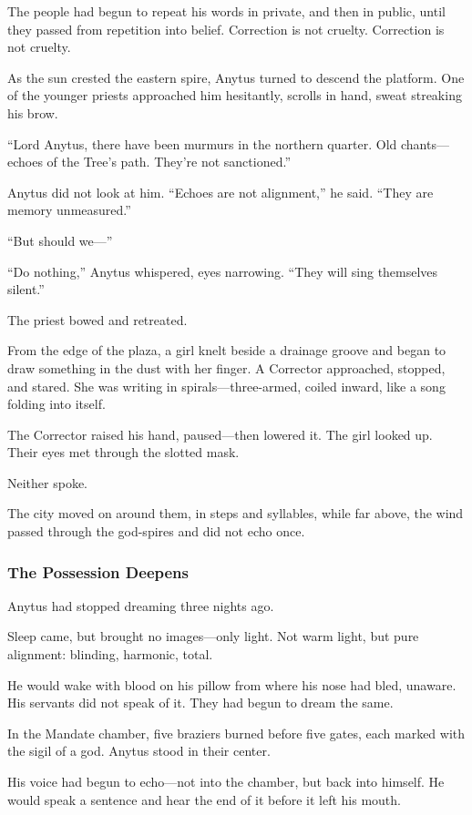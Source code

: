\documentclass[12pt]{article}
\begin{document}
The people had begun to repeat his words in private, and then in public, until they passed from repetition into belief. Correction is not cruelty. Correction is not cruelty.

As the sun crested the eastern spire, Anytus turned to descend the platform. One of the younger priests approached him hesitantly, scrolls in hand, sweat streaking his brow.

“Lord Anytus, there have been murmurs in the northern quarter. Old chants—echoes of the Tree’s path. They’re not sanctioned.”

Anytus did not look at him. “Echoes are not alignment,” he said. “They are memory unmeasured.”

“But should we—”

“Do nothing,” Anytus whispered, eyes narrowing. “They will sing themselves silent.”

The priest bowed and retreated.

From the edge of the plaza, a girl knelt beside a drainage groove and began to draw something in the dust with her finger. A Corrector approached, stopped, and stared. She was writing in spirals—three-armed, coiled inward, like a song folding into itself.

The Corrector raised his hand, paused—then lowered it. The girl looked up. Their eyes met through the slotted mask.

Neither spoke.

The city moved on around them, in steps and syllables, while far above, the wind passed through the god-spires and did not echo once.

\dotfill

\subsubsection*{The Possession Deepens}

Anytus had stopped dreaming three nights ago.

Sleep came, but brought no images—only light. Not warm light, but pure alignment: blinding, harmonic, total. 

He would wake with blood on his pillow from where his nose had bled, unaware. His servants did not speak of it. They had begun to dream the same.

In the Mandate chamber, five braziers burned before five gates, each marked with the sigil of a god. Anytus stood in their center. 

His voice had begun to echo—not into the chamber, but back into himself. He would speak a sentence and hear the end of it before it left his mouth.
\end{document}

